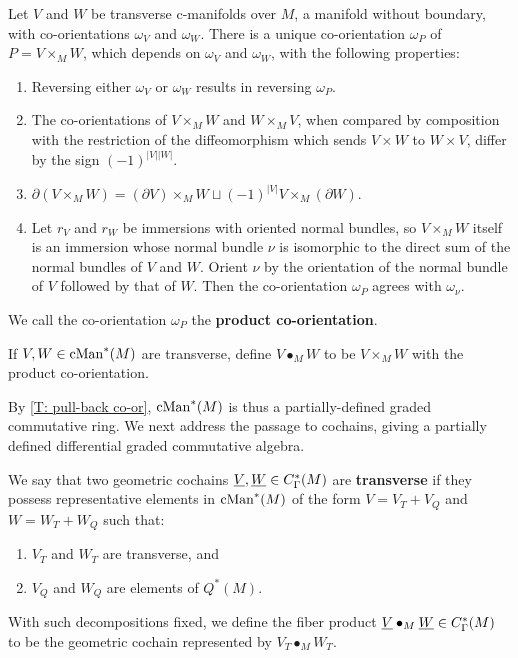 \begin{theorem}\label{T: pull-back co-or}
	Let $V$ and $W$ be transverse c-manifolds over $M$, a manifold without boundary,
	with co-orientations $\omega_V$ and $\omega_W$.
	There is a unique co-orientation $\omega_P$ of $P = V \times_M W$, which depends on $\omega_V$ and $\omega_W$, with the following properties:
	\begin{enumerate}
		\item Reversing either $\omega_V$ or $\omega_W$ results in reversing $\omega_P$.
		\item The co-orientations of $V \times_M W$ and $W \times_M V$, when compared by composition with the restriction of the diffeomorphism which sends
		$V \times W$ to $W \times V$, differ by the sign $(-1)^{|V||W|}$.
		\item $\partial ( V \times_M W) = (\partial V) \times_M W \sqcup (-1)^{|V|} V \times_M (\partial W)$.
		\item Let $r_V$ and $r_W$ be immersions with oriented normal bundles, so $V \times_M W$ itself is an immersion whose
		normal bundle $\nu$ is isomorphic to the direct sum of the normal bundles of $V$ and $W$.
		Orient $\nu$ by the orientation of the normal bundle of $V$ followed by that of $W$.
		Then the co-orientation $\omega_P$ agrees with $\omega_{\nu}$.
	\end{enumerate}
\end{theorem}

We call the co-orientation $\omega_P$ the {\bf product co-orientation}.

\begin{definition}
	If $V, W \in \mathrm{cMan}^*(M)$ are transverse, define $V \bullet_M W$ to be $V \times_M W$ with the product co-orientation.
\end{definition}

By \cref{T: pull-back co-or}, $ \mathrm{cMan}^*(M)$ is thus a partially-defined graded commutative ring.
We next address the passage to cochains, giving a partially defined differential graded commutative algebra.

\begin{definition}\label{D: cochain trans}
	We say that two geometric cochains $\underline{V}, \underline{W} \in C^*_{\Gamma}(M)$ are \textbf{transverse} if they possess representative elements in $\mathrm{cMan}^*(M)$ of the form
	$V = V_T + V_Q$ and $W = W_T + W_Q$
	such that:
	\begin{enumerate}
		\item ${V_T}$ and ${W_T}$ are transverse, and
		\item ${V_Q}$ and ${W_Q}$ are elements of $Q^\ast(M)$.
	\end{enumerate}

	With such decompositions fixed, we define the fiber product $\underline{V} \bullet_M \underline{W} \in C^*_\Gamma(M)$
	to be the geometric cochain represented by $V_T \bullet_M W_T$.
\end{definition}

